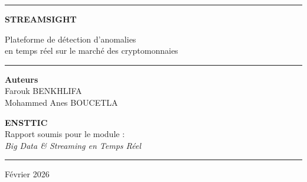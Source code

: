 \documentclass[12pt, a4paper]{article}
\begin{document}
\color{textmain}

\begin{titlepage}
    \thispagestyle{empty}
    \begin{center}
        
        \vspace*{1.5cm}
        
        {\color{accent}\rule{\textwidth}{2pt}}
        
        \vspace{1.2cm}
        
        {\fontsize{36}{42}\selectfont\bfseries\color{accentdark} STREAMSIGHT}
        
        \vspace{0.6cm}
        
        {\Large\color{textsecond} Plateforme de d\'etection d'anomalies\\[4pt] en temps r\'eel sur le march\'e des cryptomonnaies}
        
        \vspace{0.5cm}
        
        {\color{accent}\rule{0.4\textwidth}{1pt}}
        
        \vspace{2.5cm}
        
        {\large\color{textmain}
        \textbf{Auteurs}\\[10pt]
        Farouk BENKHLIFA\\[4pt]
        Mohammed Anes BOUCETLA
        }
        
        \vfill
        
        {\color{textsecond}
        \textbf{ENSTTIC}\\[8pt]
        Rapport soumis pour le module :\\[4pt]
        \textit{Big Data \& Streaming en Temps R\'eel}
        }
        
        \vspace{1.2cm}
        
        {\color{accent}\rule{\textwidth}{2pt}}
        
        \vspace{0.6cm}
        
        {\Large\color{textsecond} F\'evrier 2026}
        
    \end{center}
\end{titlepage}
\end{document}
